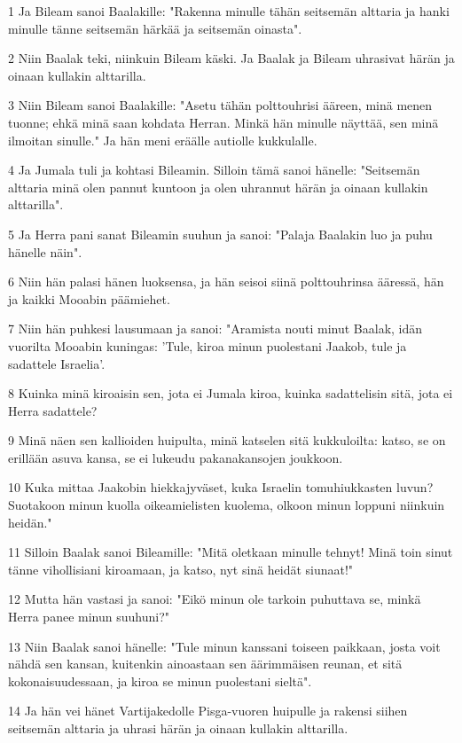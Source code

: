 \par 1 Ja Bileam sanoi Baalakille: "Rakenna minulle tähän seitsemän alttaria ja hanki minulle tänne seitsemän härkää ja seitsemän oinasta".
\par 2 Niin Baalak teki, niinkuin Bileam käski. Ja Baalak ja Bileam uhrasivat härän ja oinaan kullakin alttarilla.
\par 3 Niin Bileam sanoi Baalakille: "Asetu tähän polttouhrisi ääreen, minä menen tuonne; ehkä minä saan kohdata Herran. Minkä hän minulle näyttää, sen minä ilmoitan sinulle." Ja hän meni eräälle autiolle kukkulalle.
\par 4 Ja Jumala tuli ja kohtasi Bileamin. Silloin tämä sanoi hänelle: "Seitsemän alttaria minä olen pannut kuntoon ja olen uhrannut härän ja oinaan kullakin alttarilla".
\par 5 Ja Herra pani sanat Bileamin suuhun ja sanoi: "Palaja Baalakin luo ja puhu hänelle näin".
\par 6 Niin hän palasi hänen luoksensa, ja hän seisoi siinä polttouhrinsa ääressä, hän ja kaikki Mooabin päämiehet.
\par 7 Niin hän puhkesi lausumaan ja sanoi: "Aramista nouti minut Baalak, idän vuorilta Mooabin kuningas: 'Tule, kiroa minun puolestani Jaakob, tule ja sadattele Israelia'.
\par 8 Kuinka minä kiroaisin sen, jota ei Jumala kiroa, kuinka sadattelisin sitä, jota ei Herra sadattele?
\par 9 Minä näen sen kallioiden huipulta, minä katselen sitä kukkuloilta: katso, se on erillään asuva kansa, se ei lukeudu pakanakansojen joukkoon.
\par 10 Kuka mittaa Jaakobin hiekkajyväset, kuka Israelin tomuhiukkasten luvun? Suotakoon minun kuolla oikeamielisten kuolema, olkoon minun loppuni niinkuin heidän."
\par 11 Silloin Baalak sanoi Bileamille: "Mitä oletkaan minulle tehnyt! Minä toin sinut tänne vihollisiani kiroamaan, ja katso, nyt sinä heidät siunaat!"
\par 12 Mutta hän vastasi ja sanoi: "Eikö minun ole tarkoin puhuttava se, minkä Herra panee minun suuhuni?"
\par 13 Niin Baalak sanoi hänelle: "Tule minun kanssani toiseen paikkaan, josta voit nähdä sen kansan, kuitenkin ainoastaan sen äärimmäisen reunan, et sitä kokonaisuudessaan, ja kiroa se minun puolestani sieltä".
\par 14 Ja hän vei hänet Vartijakedolle Pisga-vuoren huipulle ja rakensi siihen seitsemän alttaria ja uhrasi härän ja oinaan kullakin alttarilla.
